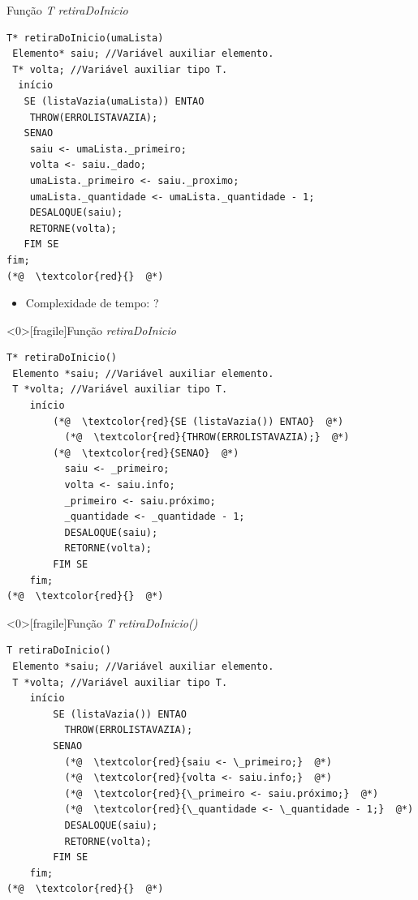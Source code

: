 \documentclass[12pt,table,xcolor={dvipsnames}]{beamer}
\begin{document}
\begin{frame}[fragile]{Função \textit{T retiraDoInicio}}
\begin{lstlisting}
T* retiraDoInicio(umaLista)
 Elemento* saiu; //Variável auxiliar elemento.
 T* volta; //Variável auxiliar tipo T.
  início
   SE (listaVazia(umaLista)) ENTAO
    THROW(ERROLISTAVAZIA);
   SENAO
    saiu <- umaLista._primeiro;
    volta <- saiu._dado;
    umaLista._primeiro <- saiu._proximo;
    umaLista._quantidade <- umaLista._quantidade - 1;
    DESALOQUE(saiu);
    RETORNE(volta);
   FIM SE
fim;
(*@  \textcolor{red}{}  @*)
\end{lstlisting}
\begin{itemize}
	\item Complexidade de tempo: ?
\end{itemize}
\end{frame}

\begin{frame}<0>[fragile]{Função \textit{retiraDoInicio}}
\begin{lstlisting}
T* retiraDoInicio()
 Elemento *saiu; //Variável auxiliar elemento.
 T *volta; //Variável auxiliar tipo T.
	início
		(*@  \textcolor{red}{SE (listaVazia()) ENTAO}  @*)
		  (*@  \textcolor{red}{THROW(ERROLISTAVAZIA);}  @*)
		(*@  \textcolor{red}{SENAO}  @*)
		  saiu <- _primeiro;
		  volta <- saiu.info;
		  _primeiro <- saiu.próximo;
		  _quantidade <- _quantidade - 1;
		  DESALOQUE(saiu);
		  RETORNE(volta);
		FIM SE
	fim;
(*@  \textcolor{red}{}  @*)
\end{lstlisting}
\end{frame}

\begin{frame}<0>[fragile]{Função \textit{T retiraDoInicio()}}
\begin{lstlisting}
T retiraDoInicio()
 Elemento *saiu; //Variável auxiliar elemento.
 T *volta; //Variável auxiliar tipo T.
	início
		SE (listaVazia()) ENTAO
		  THROW(ERROLISTAVAZIA);
		SENAO
		  (*@  \textcolor{red}{saiu <- \_primeiro;}  @*)
		  (*@  \textcolor{red}{volta <- saiu.info;}  @*)
		  (*@  \textcolor{red}{\_primeiro <- saiu.próximo;}  @*)
		  (*@  \textcolor{red}{\_quantidade <- \_quantidade - 1;}  @*)
		  DESALOQUE(saiu);
		  RETORNE(volta);
		FIM SE
	fim;
(*@  \textcolor{red}{}  @*)
\end{lstlisting}
\end{frame}
\end{document}
